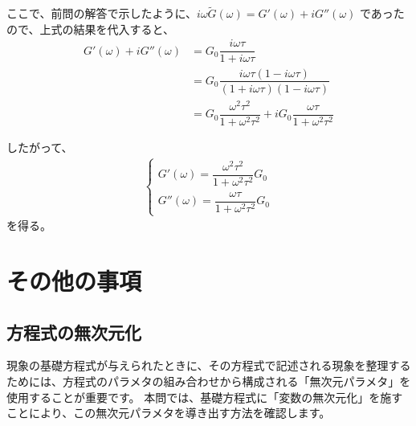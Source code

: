 \documentclass[uplatex,dvipdfmx,a4paper,11pt]{jsarticle}
\begin{document}
\begin{enumerate}
ここで、前問の解答で示したように、$i\omega \tilde{G} (\omega) = G'(\omega) + i G''(\omega)$ であったので、上式の結果を代入すると、
\begin{align*}
G'(\omega) + i G''(\omega)
	&= G_0 \dfrac{i \omega \tau}{1 + i \omega \tau} \\
	&= G_0 \dfrac{i \omega \tau \left(1 - i \omega \tau \right)}{\left(1 + i \omega \tau \right) \left(1 - i \omega \tau \right)} \\
	&= G_0 \dfrac{\omega^2 \tau^2}{1+ \omega^2 \tau^2} +i G_0 \dfrac{\omega \tau}{1+ \omega^2 \tau^2}
\end{align*}

したがって、
\begin{align*}
\begin{cases}
G' (\omega) = \dfrac{\omega^2 \tau^2}{1+\omega^2 \tau^2} G_0 \\[8pt]
G'' (\omega) = \dfrac{\omega \tau}{1+\omega^2 \tau^2} G_0
\end{cases}
\end{align*}
を得る。

\end{enumerate}

\section{その他の事項}

\subsection{方程式の無次元化}

\begin{boxnote}
現象の基礎方程式が与えられたときに、その方程式で記述される現象を整理するためには、方程式のパラメタの組み合わせから構成される「無次元パラメタ」を使用することが重要です。
本問では、基礎方程式に「変数の無次元化」を施すことにより、この無次元パラメタを導き出す方法を確認します。


\end{boxnote}

\vspace{10pt}
\end{document}
